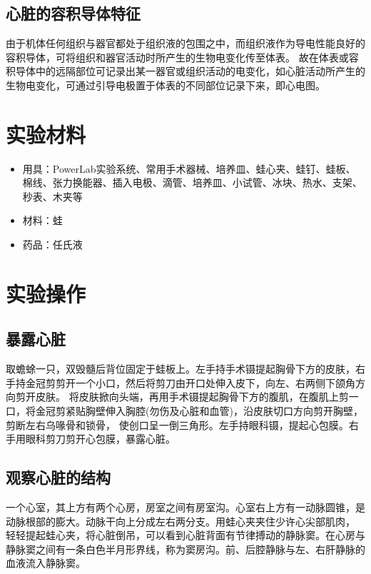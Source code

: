 \documentclass[UTF8]{article}
\begin{document}
    \subsection{心脏的容积导体特征}
    由于机体任何组织与器官都处于组织液的包围之中，而组织液作为导电性能良好的容积导体，可将组织和器官活动时所产生的生物电变化传至体表。
    故在体表或容积导体中的远隔部位可记录出某一器官或组织活动的电变化，如心脏活动所产生的生物电变化，可通过引导电极置于体表的不同部位记录下来，即心电图。
    \section{实验材料}
    \begin{itemize}
        \item 用具：PowerLab实验系统、常用手术器械、培养皿、蛙心夹、蛙钉、蛙板、棉线、张力换能器、插入电极、滴管、培养皿、小试管、冰块、热水、支架、秒表、木夹等
        \item 材料：蛙
        \item 药品：任氏液
    \end{itemize}
    \section{实验操作}
    \subsection{暴露心脏}
    取蟾蜍一只，双毁髓后背位固定于蛙板上。左手持手术镊提起胸骨下方的皮肤，右手持金冠剪剪开一个小口，然后将剪刀由开口处伸入皮下，向左、右两侧下颌角方向剪开皮肤。
    将皮肤掀向头端，再用手术镊提起胸骨下方的腹肌，在腹肌上剪一口，将金冠剪紧贴胸壁伸入胸腔(勿伤及心脏和血管)，沿皮肤切口方向剪开胸壁，剪断左右乌喙骨和锁骨，
    使创口呈一倒三角形。左手持眼科镊，提起心包膜。右手用眼科剪刀剪开心包膜，暴露心脏。
    \subsection{观察心脏的结构}
    一个心室，其上方有两个心房，房室之间有房室沟。心室右上方有一动脉圆锥，是动脉根部的膨大。动脉干向上分成左右两分支。用蛙心夹夹住少许心尖部肌肉，
    轻轻提起蛙心夹，将心脏倒吊，可以看到心脏背面有节律搏动的静脉窦。在心房与静脉窦之间有一条白色半月形界线，称为窦房沟。前、后腔静脉与左、右肝静脉的血液流入静脉窦。
\end{document}
